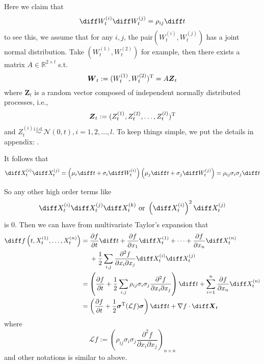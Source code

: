 \begin{subproblem}[(\alph*)]
        \item
        Here we claim that
        \[\diff W_t^{(i)}\diff W_t^{(j)}=\rho_{ij}\diff t\]
        to see this,
        we assume that for any $i,j$, the pair$(W_t^{(i)},W_t^{(j)})$
        has a joint normal distribution. Take $(W_t^{(1)},W_t^{(2)})$ for example,
        then there exists a matrix $A\in\mathbb R^{2\times l}$ s.t.
        \[\boldsymbol W_t:=(W_t^{(1)},W_t^{(2)})^\mathrm T
        =A\boldsymbol Z_t\]
        where $\boldsymbol Z_t$ is a random vector composed of independent normally
        distributed processes, i.e.,
        \[\boldsymbol Z_t:=(Z_t^{(1)},Z_t^{(2)},\ldots,Z_t^{(l)})^\mathrm T\]
        and $Z_t^{(i)}\overset{\text{i.i.d.}}\sim\mathcal N(0,t),i=1,2,\ldots,l$.
        To keep things simple, we put the details in appendix: .

        It follows that
        \[\diff X_t^{(i)}\diff X_t^{(j)}
        =\left(\mu_i\diff t+\sigma_i\diff W_t^{(i)}\right)
        \left(\mu_j\diff t+\sigma_j\diff W_t^{(j)}\right)
        =\rho_{ij}\sigma_i\sigma_j\diff t\]

        So any other high order terms like
        \[\diff X_t^{(i)}\diff X_t^{(j)}\diff X_t^{(k)}\text{ or }
        \left(\diff X_t^{(i)}\right)^2\diff X_t^{(j)}\]
        is 0. Then we can have from multivariate Taylor's expansion
        that
        \[\begin{aligned}
            \diff f\left(t,X_t^{(1)},\ldots,X_t^{(n)}\right)&=
            \begin{aligned}[t]
            &\frac{\partial f}{\partial t}\diff t
            +\frac{\partial f}{\partial x_1}\diff X_t^{(1)}
            +\cdots
            +\frac{\partial f}{\partial x_n}\diff X_t^{(n)}\\
            &+\frac{1}{2}\sum_{i,j}\frac{\partial^2 f}{\partial x_i\partial x_j}
            \diff X_t^{(i)}\diff X_t^{(j)}\\
            \end{aligned}\\
            &=\left(\frac{\partial f}{\partial t}
            +\frac{1}{2}\sum_{i,j}\rho_{ij}\sigma_i\sigma_j
            \frac{\partial^2 f}{\partial x_i\partial x_j}
            \right)\diff t
            +\sum_{i=1}^n\frac{\partial f}{\partial x_n}\diff X_t^{(n)}\\
            &=\left(\frac{\partial f}{\partial t}
            +\frac{1}{2}\boldsymbol\sigma^\trans(\mathcal Lf)\boldsymbol\sigma\right)
            \diff t
            +\nabla f\cdot\diff\boldsymbol X_t
        \end{aligned}\]
        where
        \[\mathcal Lf:=\left(\rho_{ij}\sigma_i\sigma_j
            \frac{\partial^2 f}{\partial x_i\partial x_j}\right)_{n\times n}\]
        and other notations is similar to above.

    \end{subproblem}

